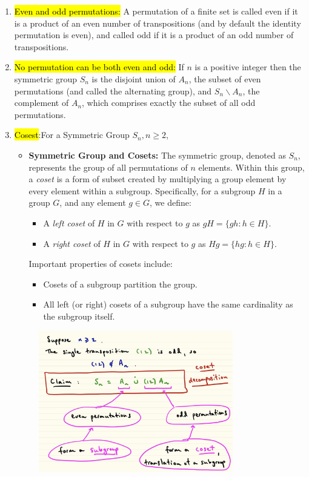 \documentclass{article}
\begin{document}
\begin{enumerate}
    \item \hl{Even and odd permutations:} A permutation of a finite set is called even if it is a product of an even number of transpositions (and by default the identity permutation is even), and called odd if it is a product of an odd number of transpositions.
    \item \hl{No permutation can be both even and odd:} If $n$ is a positive integer then the symmetric group $S_{n}$ is the disjoint union of $A_{n}$, the subset of even permutations (and called the alternating group), and $S_{n} \backslash A_{n}$, the complement of $A_{n}$, which comprises exactly the subset of all odd permutations.
    
    \newpage

    \item \hl{Cosest}:For a Symmetric Group $S_n, n\geq 2$,
    \begin{itemize}
        \item \textbf{Symmetric Group and Cosets:} The symmetric group, denoted as $S_n$, represents the group of all permutations of $n$ elements. Within this group, a \textit{coset} is a form of subset created by multiplying a group element by every element within a subgroup. Specifically, for a subgroup $H$ in a group $G$, and any element $g \in G$, we define:
        \begin{itemize}
            \item A \textit{left coset} of $H$ in $G$ with respect to $g$ as $gH = \{gh : h \in H\}$.
            \item A \textit{right coset} of $H$ in $G$ with respect to $g$ as $Hg = \{hg : h \in H\}$.
        \end{itemize}
        Important properties of cosets include:
        \begin{itemize}
            \item Cosets of a subgroup partition the group.
            \item All left (or right) cosets of a subgroup have the same cardinality as the subgroup itself.
        \end{itemize}
    \end{itemize}

    \begin{figure}[htbp]
        \centering %
        \includegraphics[width=0.8\textwidth]{Graphs/Coset.jpg} %
    \end{figure}
    

\end{enumerate}
\end{document}
